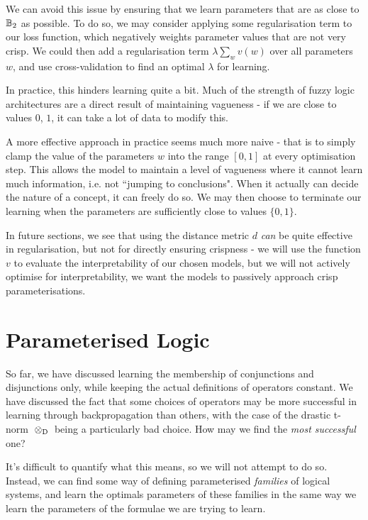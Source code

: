 We can avoid this issue by ensuring that we learn parameters that are as close to $\mathbb{B}_2$ as possible. To do so, we may consider applying some regularisation term to our loss function, which negatively weights parameter values that are not very crisp. We could then add a regularisation term $\lambda \sum_w v(w)$ over all parameters $w$, and use cross-validation to find an optimal $\lambda$ for learning.

In practice, this hinders learning quite a bit. Much of the strength of fuzzy logic architectures are a direct result of maintaining vagueness - if we are close to values $0$, $1$, it can take a lot of data to modify this.

A more effective approach in practice seems much more naive - that is to simply clamp the value of the parameters $w$ into the range $[0,1]$ at every optimisation step. This allows the model to maintain a level of vagueness where it cannot learn much information, i.e. not ``jumping to conclusions". When it actually can decide the nature of a concept, it can freely do so. We may then choose to terminate our learning when the parameters are sufficiently close to values $\{0,1\}$.

In future sections, we see that using the distance metric $d$ \textit{can} be quite effective in regularisation, but not for directly ensuring crispness - we will use the function $v$ to evaluate the interpretability of our chosen models, but we will not actively optimise for interpretability, we want the models to passively approach crisp parameterisations.

\section{Parameterised Logic}

So far, we have discussed learning the membership of conjunctions and disjunctions only, while keeping the actual definitions of operators constant. We have discussed the fact that some choices of operators may be more successful in learning through backpropagation than others, with the case of the drastic t-norm ${\mspace{4mu}\otimes_\text{D}\mspace{4mu}}$ being a particularly bad choice. How may we find the \textit{most successful} one? 

It's difficult to quantify what this means, so we will not attempt to do so. Instead, we can find some way of defining parameterised \textit{families} of logical systems, and learn the optimals parameters of these families in the same way we learn the parameters of the formulae we are trying to learn.

